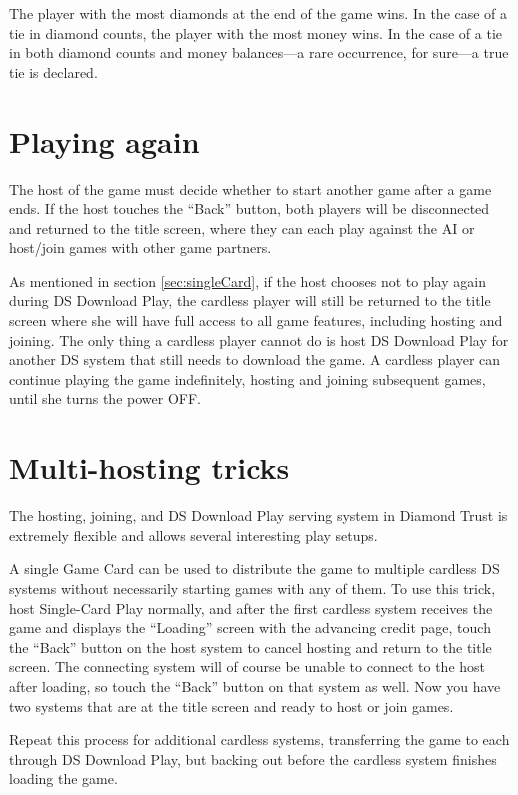 \documentclass[8pt]{extbook}
\begin{document}
The player with the most diamonds at the end of the game wins.  In the case of a tie in diamond counts, the player with the most money wins.  In the case of a tie in both diamond counts and money balances---a rare occurrence, for sure---a true tie is declared.



\section{Playing again}
The host of the game must decide whether to start another game after a game ends.  If the host touches the ``Back'' button, both players will be disconnected and returned to the title screen, where they can each play against the AI or host/join games with other game partners.

As mentioned in section \ref{sec:singleCard}, if the host chooses not to play again during DS Download Play, the cardless player will still be returned to the title screen where she will have full access to all game features, including hosting and joining.  The only thing a cardless player cannot do is host DS Download Play for another DS system that still needs to download the game.  A cardless player can continue playing the game indefinitely, hosting and joining subsequent games, until she turns the power OFF.


\section{Multi-hosting tricks}
\label{sec:multiHosting}
The hosting, joining, and DS Download Play serving system in Diamond Trust is extremely flexible and allows several interesting play setups.

A single Game Card can be used to distribute the game to multiple cardless DS systems without necessarily starting games with any of them.  To use this trick, host Single-Card Play normally, and after the first cardless system receives the game and displays the ``Loading'' screen with the advancing credit page, touch the ``Back'' button on the host system to cancel hosting and return to the title screen.  The connecting system will of course be unable to connect to the host after loading, so touch the ``Back'' button on that system as well.  Now you have two systems that are at the title screen and ready to host or join games.

Repeat this process for additional cardless systems, transferring the game to each through DS Download Play, but backing out before the cardless system finishes loading the game.
\end{document}
